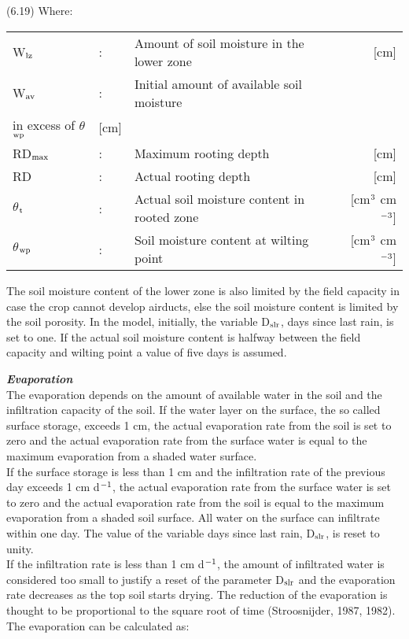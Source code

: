  
\strut\hfill (6.19)
Where:\\
\begin{tabularx}{\textwidth}{llXr}



 W$_{{\rm lz}}$ &:& Amount of soil moisture in the lower zone & [cm]\\
 W$_{{\rm av}}$ &:& Initial amount of available soil moisture \\
    in excess of $\theta$$_{{\rm wp}}$ & [cm]\\
 RD$_{{\rm max}}$ &:& Maximum rooting depth & [cm]\\
 RD &:& Actual rooting depth & [cm]\\
 $\theta$$_{{\rm t}}$ &:& Actual soil moisture content in rooted zone  & [cm$^{{\rm 3}}$ cm$^{{\rm -3}}$]\\
 $\theta$$_{{\rm wp}}$ &:& Soil moisture content at wilting point  & [cm$^{{\rm 3}}$ cm$^{{\rm -3}}$]
\end{tabularx}






The soil moisture content of the lower zone is also limited by the field capacity in case
the crop cannot develop airducts, else the soil moisture content is limited by the soil
porosity. In the model, initially, the variable D$_{{\rm slr}}$, days since last rain, is set to one. If the
actual soil moisture content is halfway between the field capacity and wilting point a
value of five days is assumed. 



{\it {\bf Evaporation}\/}\\
The evaporation depends on the amount of available water in the soil and the infiltration
capacity of the soil. If the water layer on the surface, the so called surface storage, 
exceeds 1 cm, the actual {\nobreak}evaporation rate from the soil is set to zero and the actual
evaporation rate from the surface water is equal to the maximum evaporation from a
shaded water surface.\\
If the surface storage is less than 1 cm and the infiltration rate of the previous day
exceeds 1 cm d$^{{\rm -1}}$, the actual evaporation rate from the surface water is set to zero and the
actual evaporation rate from the soil is equal to the maximum evaporation from a shaded
soil surface. All water on the surface can infiltrate within one day. The value of the
variable days since last rain, D$_{{\rm slr}}$, is reset to unity.\\
If the infiltration rate is less than 1 cm d$^{{\rm -1}}$, the amount of infiltrated water is consid\-ered
too small to justify a reset of the parameter D$_{{\rm slr}}$ and the evaporation rate decreases as the
top soil starts drying. The reduction of the evaporation is thought to be proportional to the
square root of time (Stroosnijder, 1987, 1982). The evaporation can be calculated as:

